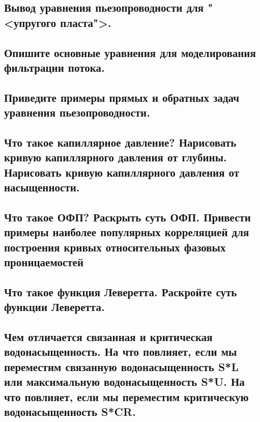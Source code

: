 \documentclass[main.tex]{subfiles}
\begin{document}
\newpage

\subsection{Вывод уравнения пьезопроводности для "<упругого пласта">.}

\newpage

\subsection{Опишите основные уравнения для моделирования фильтрации потока.}

\newpage

\subsection{Приведите примеры прямых и обратных задач уравнения пьезопроводности.}

\newpage

\subsection{Что такое капиллярное давление? Нарисовать кривую капиллярного давления от глубины. Нарисовать кривую капиллярного давления от насыщенности.}

\newpage

\subsection{Что такое ОФП? Раскрыть суть ОФП. Привести примеры наиболее популярных корреляцией для построения кривых относительных фазовых проницаемостей}

\newpage

\subsection{Что такое функция Леверетта. Раскройте суть функции Леверетта.}

\newpage

\subsection{Чем отличается связанная и критическая водонасыщенность. На что повлияет, если мы переместим связанную водонасыщенность S*L или максимальную водонасыщенность S*U. На что повлияет, если мы переместим критическую водонасыщенность S*CR.}
\end{document}
